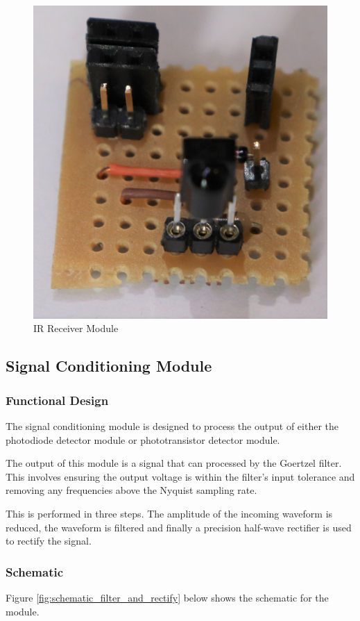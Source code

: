 \begin{figure}[H]
	\centering
	\includegraphics[width=.6\textwidth]{figures/modules/ir_receiver.jpg}
	\caption{IR Receiver Module}
	\label{fig:module_ir_receiver}
\end{figure}






\subsection{Signal Conditioning Module}

\subsubsection{Functional Design}
The signal conditioning module is designed to process the output of either the photodiode detector module or phototransistor detector module.

The output of this module is a signal that can processed by the Goertzel filter. This involves ensuring the output voltage is within the filter's input tolerance and removing any frequencies above the Nyquist sampling rate.

This is performed in three steps. The amplitude of the incoming waveform is reduced, the waveform is filtered and finally a precision half-wave rectifier is used to rectify the signal.

\subsubsection{Schematic}
Figure \ref{fig:schematic_filter_and_rectify} below shows the schematic for the module.

